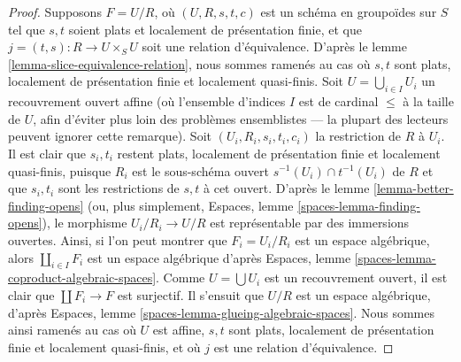\begin{proof}
\medskip\noindent
Supposons $F = U/R$, où $(U, R, s, t, c)$ est un schéma en groupoïdes
sur $S$ tel que $s, t$ soient plats et localement de présentation finie, et que
$j = (t, s) : R \to U \times_S U$ soit une relation d'équivalence. D'après le
lemme \ref{lemma-slice-equivalence-relation},
nous sommes ramenés au cas où $s, t$ sont plats,
localement de présentation finie et localement quasi-finis.
Soit $U = \bigcup_{i \in I} U_i$ un recouvrement ouvert affine
(où l'ensemble d'indices $I$ est de cardinal $\leq$ à la taille de $U$, afin d'éviter
plus loin des problèmes ensemblistes --- la plupart des lecteurs peuvent ignorer cette remarque).
Soit $(U_i, R_i, s_i, t_i, c_i)$ la restriction de $R$
à $U_i$. Il est clair que $s_i, t_i$ restent plats, localement de présentation
finie et localement quasi-finis, puisque $R_i$ est le sous-schéma ouvert
$s^{-1}(U_i) \cap t^{-1}(U_i)$ de $R$
et que $s_i, t_i$ sont les restrictions de $s, t$ à cet ouvert. D'après le
lemme \ref{lemma-better-finding-opens}
(ou, plus simplement,
Espaces, lemme \ref{spaces-lemma-finding-opens}),
le morphisme $U_i/R_i \to U/R$ est représentable par des immersions ouvertes.
Ainsi, si l'on peut montrer que $F_i = U_i/R_i$ est un espace algébrique, alors
$\coprod_{i \in I} F_i$ est un espace algébrique d'après
Espaces, lemme \ref{spaces-lemma-coproduct-algebraic-spaces}.
Comme $U = \bigcup U_i$ est un recouvrement ouvert, il est clair que
$\coprod F_i \to F$ est surjectif. Il s'ensuit que
$U/R$ est un espace algébrique, d'après
Espaces, lemme \ref{spaces-lemma-glueing-algebraic-spaces}.
Nous sommes ainsi ramenés au cas où $U$ est affine, $s, t$ sont plats,
localement de présentation finie et localement quasi-finis, et où
$j$ est une relation d'équivalence.


\end{proof}
